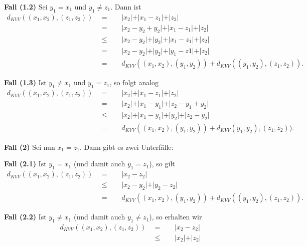 \documentclass[11pt]{book}
\numberwithin{dummy}{section}
\theoremstyle{nonumberbreak}
\newenvironment{prob}[1][]{\ifthenelse{\equal{#1}{}}{\problem}{\problem[#1]}\rm}{\endproblem}
\newenvironment{sol}[1][]{\ifthenelse{\equal{#1}{}}{\solution}{\solution[#1]}\rm}{\endsolution}
\begin{document}
\begin{spacing}{1.4}
\begin{prob}
\begin{sol}
\begin{compactenum}
\begin{compactenum}
\begin{compactenum}
\item[\textbf{Fall (1.2)}] Sei $y_1=x_1$ und $y_1\neq z_1$. Dann ist
\begin{alignat*}{5}
d_{KVV}((x_1,x_2),(z_1,z_2)) \ \ &=&& \ \ \vert x_2 \vert + \vert x_1-z_1\vert + \vert z_2\vert \\
&=&& \ \ \vert x_2-y_2+y_2\vert + \vert x_1-z_1\vert + \vert z_2\vert \\
&\leqslant&& \ \ \vert x_2-y_2\vert + \vert y_2\vert + \vert x_1-z_1\vert + \vert z_2\vert \\
&=&& \ \ \vert x_2 - y_2 \vert + \vert y_2\vert + \vert y_1-z1\vert + \vert z_2\vert \\
&=&& \ \ d_{KVV}((x_1,x_2),(y_1,y_2)) + d_{KVV}((y_1,y_2),(z_1,z_2)).
\end{alignat*}
\item[\textbf{Fall (1.3)}] Ist $y_1\neq x_1$ und $y_1=z_1$, so folgt analog
\begin{alignat*}{5}
d_{KVV}((x_1,x_2),(z_1,z_2)) \ \ &=&& \ \ \vert x_2\vert + \vert x_1-z_1\vert + \vert z_2\vert \\
&=&& \ \ \vert x_2\vert + \vert x_1-y_1\vert + \vert z_2-y_1+y_2\vert \\
&\leqslant&& \ \ \vert x_2\vert + \vert x_1-y_1\vert + \vert y_2\vert + \vert z_2-y_2\vert\\
&=&& \ \ d_{KVV}((x_1,x_2),(y_1,y_2)) + d_{KVV}(y_1,y_2),(z_1,z_2)).
\end{alignat*}
\end{compactenum}
\item[\textbf{Fall (2)}]Sei nun $x_1=z_1$. Dann gibt es zwei Unterfälle:
\begin{compactenum}
\item[\textbf{Fall (2.1)}] Ist $y_1=x_1$ (und damit auch $y_1=z_1$), so gilt
\begin{alignat*}{5}
d_{KVV}((x_1,x_2),(z_1,z_2)) \ \ &=&& \ \ \vert x_2-z_2\vert \\
&\leqslant&& \ \ \vert x_2 - y_2\vert + \vert y_2-z_2\vert \\
&=&& \ \ d_{KVV}((x_1,x_2),(y_1,y_2)) + d_{KVV}((y_1,y_2),(z_1,z_2)).
\end{alignat*}
\item[\textbf{Fall (2.2)}] Ist $y_1\neq x_1$ (und damit auch $y_1\neq z_1$), so erhalten wir
\begin{alignat*}{5}
d_{KVV}((x_1,x_2),(z_1,z_2)) \ \ &=&& \ \ \vert x_2 - z_2\vert \\
&\leqslant&&\ \  \vert x_2\vert + \vert z_2\vert \\

\end{alignat*}
\end{compactenum}
\end{compactenum}
\end{compactenum}
\end{sol}
\end{prob}
\end{spacing}
\end{document}
